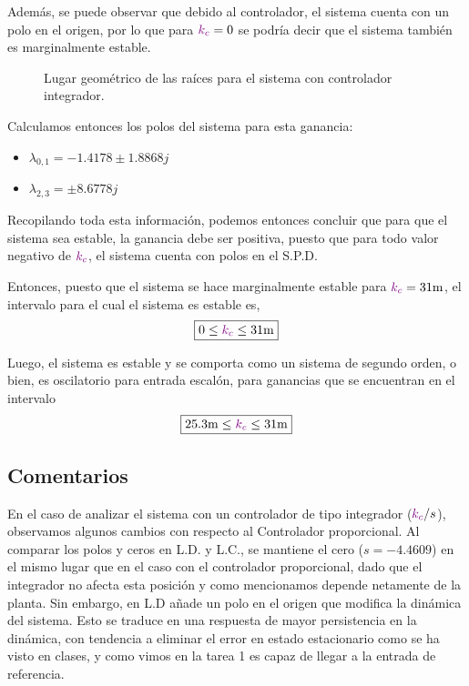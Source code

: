 Además, se puede observar que debido al controlador, el sistema cuenta con un
polo en el origen, por lo que para $\mathbin{\color{violet}k_{c}} = 0$ se podría decir que el
sistema también es marginalmente estable.

\begin{figure}[ht]
    \centering
    
    \caption{Lugar geométrico de las raíces para el sistema con controlador integrador.}
    \label{fig:lgr-h2}
\end{figure}

Calculamos entonces los polos del sistema para esta ganancia:
\begin{itemize}
    \item $\lambda_{0,1} = -1.4178 \pm 1.8868j$
    \item $\lambda_{2,3} = \pm 8.6778j$ \\
\end{itemize}

Recopilando toda esta información, podemos entonces concluir que para que el
sistema sea estable, la ganancia debe ser positiva, puesto que para todo valor
negativo de $\mathbin{\color{violet}k_{c}}$, el sistema cuenta con polos en el S.P.D.

Entonces, puesto que el sistema se hace marginalmente estable para $\mora{k_{c}} = 31\unit{m}$,
el intervalo para el cual el sistema es estable es,
\begin{equation}
    \boxed{0 \leq \mora{k_{c}} \leq 31\unit{m}}
\end{equation}

Luego, el sistema es estable y se comporta como un sistema de segundo orden, o
bien, es oscilatorio para entrada escalón, para ganancias que se encuentran en
el intervalo
\begin{equation}
    \boxed{25.3\unit{m} \leq \mora{k_{c}} \leq 31\unit{m}}
\end{equation}

\subsection{Comentarios}


 En el caso de analizar el sistema con un controlador de tipo integrador (\(\mathbin{\color{violet}k_c}/s\)), observamos algunos cambios con respecto al Controlador proporcional. Al comparar los polos y ceros en L.D. y L.C., se mantiene el cero ($s = -4.4609$) en el mismo lugar que en el caso con el controlador proporcional, dado que el integrador no afecta esta posición y como mencionamos depende netamente de la planta. Sin embargo, en L.D añade un polo en el origen que modifica la dinámica del sistema. Esto se traduce en una respuesta de mayor persistencia en la dinámica, con tendencia a eliminar el error en estado estacionario como se ha visto en clases, y como vimos en la tarea 1 \cite{tarea-1-sdc} es capaz de llegar a la entrada de referencia.

